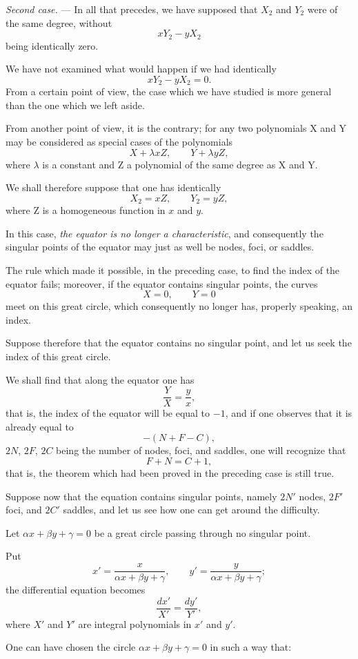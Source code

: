 \documentclass[11pt]{article}
\begin{document}
\emph{Second case.} --- In all that precedes, we have supposed that $X_2$ and $Y_2$ were of the same degree, without
\[
xY_2-yX_2
\]
being identically zero.

We have not examined what would happen if we had identically
\[
xY_2-yX_2=0.
\]
From a certain point of view, the case which we have studied is more general than the one which we left aside.

From another point of view, it is the contrary; for any two polynomials X and Y may be considered as special cases of the polynomials
\[
X+\lambda xZ,
\qquad
Y+\lambda yZ,
\]
where $\lambda$ is a constant and Z a polynomial of the same degree as X and Y.

We shall therefore suppose that one has identically
\[
X_2=xZ,
\qquad
Y_2=yZ,
\]
where Z is a homogeneous function in $x$ and $y$.

In this case, \emph{the equator is no longer a characteristic}, and consequently the singular points of the equator may just as well be nodes, foci, or saddles.

The rule which made it possible, in the preceding case, to find the index of the equator fails; moreover, if the equator contains singular points, the curves
\[
X=0,
\qquad
Y=0
\]
meet on this great circle, which consequently no longer has, properly speaking, an index.

Suppose therefore that the equator contains no singular point, and let us seek the index of this great circle.

We shall find that along the equator one has
\[
\frac YX=\frac yx,
\]
that is, the index of the equator will be equal to $-1$, and if one observes that it is already equal to
\[
-(N+F-C),
\]
$2N$, $2F$, $2C$ being the number of nodes, foci, and saddles, one will recognize that
\[
F+N=C+1,
\]
that is, the theorem which had been proved in the preceding case is still true.

Suppose now that the equation contains singular points, namely $2N'$ nodes, $2F'$ foci, and $2C'$ saddles, and let us see how one can get around the difficulty.

Let $\alpha x+\beta y+\gamma=0$ be a great circle passing through no singular point.

Put
\[
x'=\frac{x}{\alpha x+\beta y+\gamma},
\qquad
 y'=\frac{y}{\alpha x+\beta y+\gamma};
\]
the differential equation becomes
\[
\frac{dx'}{X'}=\frac{dy'}{Y'},
\]
where $X'$ and $Y'$ are integral polynomials in $x'$ and $y'$.

One can have chosen the circle $\alpha x+\beta y+\gamma=0$ in such a way that:
\end{document}
